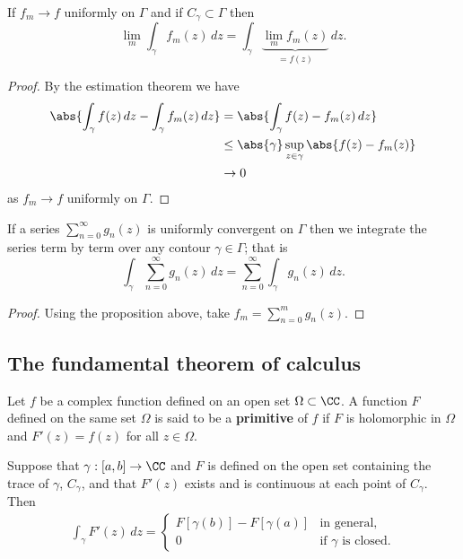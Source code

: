 \documentclass[12pt, a4paper]{article}
\begin{document}
\begin{proposition}
    If \(f_m \to f\) uniformly on \(\Gamma\) and if \(C_{\gamma} \subset \Gamma\) then 
    \[\lim_{m} \int_{\gamma} f_m(z) \, dz = \int_{\gamma} \underbrace{\lim_m f_m(z)}_{=f(z)} \, dz.\]
\end{proposition}

\begin{proof}
    By the estimation theorem we have 
    \[\begin{aligned}
        \abs{\int_{\gamma} f(z) \, dz - \int_{\gamma} f_m (z) \, dz} &= \abs{\int_{\gamma} f(z)-f_m(z) \, dz} \\
        &\leq \abs{\gamma} \sup_{z \in \gamma} \abs{f(z)-f_m(z)} \\
        &\to 0
    \end{aligned}\]
    as \(f_m \to f\) uniformly on \(\Gamma\).
\end{proof}

\begin{corollary}
    If a series \(\sum_{n=0}^{\infty} g_n(z)\) is uniformly convergent on \(\Gamma\) then we integrate the series term by term over any contour \(\gamma \in \Gamma\); that is 
    \[\int_{\gamma} \sum_{n=0}^{\infty} g_n(z) \, dz = \sum_{n=0}^{\infty} \int_{\gamma} g_n(z) \, dz.\]
\end{corollary}

\begin{proof}
    Using the proposition above, take \(f_m = \sum_{n=0}^m g_n(z)\).
\end{proof}

\subsection{The fundamental theorem of calculus}

\begin{definition}
    Let \(f\) be a complex function defined on an open set \(\Omega \subset \CC\). A function \(F\) defined on the same set \(\Omega\) is said to be a \textbf{primitive} of \(f\) if \(F\) is holomorphic in \(\Omega\) and \(F'(z) =f(z)\) for all \(z \in \Omega\).
\end{definition}

\begin{mdthm}[FTC]
    Suppose that \(\gamma : [a,b] \to \CC\) and \(F\) is defined on the open set containing the trace of \(\gamma\), \(C_{\gamma}\), and that \(F'(z)\) exists and is continuous at each point of \(C_{\gamma}\). Then
    \[\begin{aligned}
        \int_{\gamma} F'(z) \, dz = \begin{cases}
            F[\gamma(b)]-F[\gamma(a)]   &\text{in general,} \\
            0   &\text{if \(\gamma\) is closed.}
        \end{cases}
    \end{aligned}\]
\end{mdthm}
\end{document}
